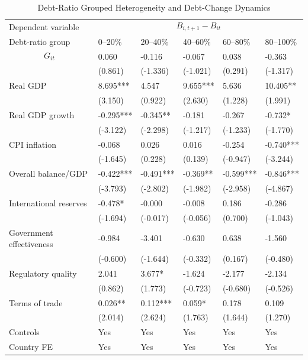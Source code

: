 \begin{table}[H]\centering
\begin{threeparttable}
\caption{Debt-Ratio Grouped Heterogeneity and Debt-Change Dynamics}
\label{tab:B_group_heterogeneity_debt}
\scriptsize
\begin{tabularx}{\textwidth}{lYYYYY}
\toprule
Dependent variable &  \\
\cmidrule(lr){2-6}
Debt-ratio group & 0--20\% & 20--40\% & 40--60\% & 60--80\% & 80--100\% \\
\midrule
$$G_{it}$$ & 0.060 & -0.116 & -0.067 & 0.038 & -0.363 \\
  & (0.861) & (-1.336) & (-1.021) & (0.291) & (-1.317) \\
Real GDP & 8.695*** & 4.547 & 9.655*** & 5.636 & 10.405** \\
  & (3.150) & (0.922) & (2.630) & (1.228) & (1.991) \\
Real GDP growth & -0.295*** & -0.345** & -0.181 & -0.267 & -0.732* \\
  & (-3.122) & (-2.298) & (-1.217) & (-1.233) & (-1.770) \\
CPI inflation & -0.068 & 0.026 & 0.016 & -0.254 & -0.740*** \\
  & (-1.645) & (0.228) & (0.139) & (-0.947) & (-3.244) \\
Overall balance/GDP & -0.422*** & -0.491*** & -0.369** & -0.599*** & -0.846*** \\
  & (-3.793) & (-2.802) & (-1.982) & (-2.958) & (-4.867) \\
International reserves & -0.478* & -0.000 & -0.008 & 0.186 & -0.286 \\
  & (-1.694) & (-0.017) & (-0.056) & (0.700) & (-1.043) \\
Government effectiveness & -0.984 & -3.401 & -0.630 & 0.638 & -1.560 \\
  & (-0.600) & (-1.644) & (-0.332) & (0.167) & (-0.480) \\
Regulatory quality & 2.041 & 3.677* & -1.624 & -2.177 & -2.134 \\
  & (0.862) & (1.773) & (-0.723) & (-0.680) & (-0.526) \\
Terms of trade & 0.026** & 0.112*** & 0.059* & 0.178 & 0.109 \\
  & (2.014) & (2.624) & (1.763) & (1.644) & (1.270) \\
\midrule
Controls & Yes & Yes & Yes & Yes & Yes \\
Country FE & Yes & Yes & Yes & Yes & Yes \\

\end{tabularx}
\end{threeparttable}
\end{table}
